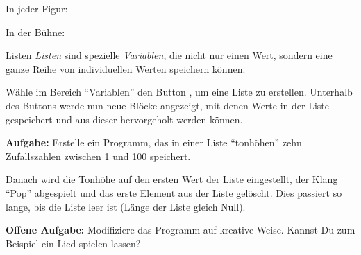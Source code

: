 \documentclass[lerntheke,12pt,a5paper,landscape]{arbeitsblatt}
\begin{document}
\begin{loesungskarte}
\begin{multicols}{2}
	In jeder Figur:

	\begin{scratch}[scale=0.7]
	\end{scratch}

	\begin{scratch}[scale=0.7]
	\end{scratch}
	\columnbreak

	In der Bühne:

	\begin{scratch}[scale=0.7]
	\end{scratch}

	\begin{scratch}[scale=0.7]
	\end{scratch}
\end{multicols}
\end{loesungskarte}


\begin{karte3}{Listen}
	\emph{Listen} sind spezielle \emph{Variablen}, die nicht nur einen Wert, sondern eine ganze Reihe von individuellen Werten speichern können.

	Wähle im Bereich \enquote{Variablen} den Button , um eine Liste zu erstellen. Unterhalb des Buttons werde nun neue Blöcke angezeigt, mit denen Werte in der Liste gespeichert und aus dieser hervorgeholt werden können.

	\textbf{Aufgabe:} Erstelle ein Programm, das in einer Liste \enquote{tonhöhen} zehn Zufallszahlen zwischen 1 und 100 speichert.

	Danach wird die Tonhöhe auf den ersten Wert der Liste eingestellt, der Klang \enquote{Pop} abgespielt und das erste Element aus der Liste gelöscht. Dies passiert so lange, bis die Liste leer ist (Länge der Liste gleich Null).

	\textbf{Offene Aufgabe:} Modifiziere das Programm auf kreative Weise. Kannst Du zum Beispiel ein Lied spielen lassen?
\end{karte3}
\end{document}
